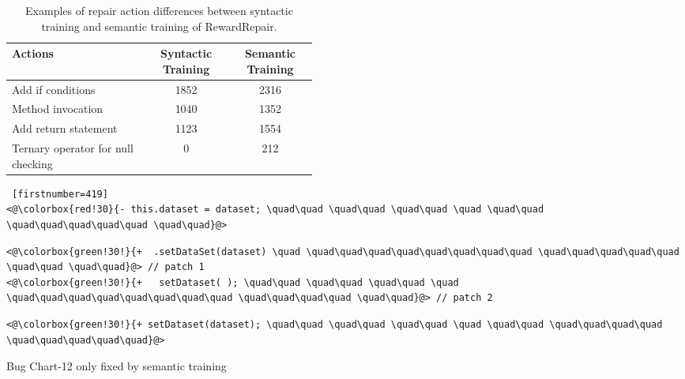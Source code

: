 \begin{table}[t]
\footnotesize
\renewcommand{\arraystretch}{1.1}
\begin{tabular}{p{0.45\linewidth}cc}
\hline
 Actions & Syntactic Training & Semantic Training  \\
 \hline
 
\multirow{1}{*}{Add if conditions} &\multirow{1}{*}{1852} &\multirow{1}{*}{2316} \\ 

Method invocation & 1040 & 1352  \\

Add return statement & 1123 & 1554  \\

Ternary operator for null checking & 0&212\\
\hline
\end{tabular}
\caption{Examples of repair action differences between syntactic training and semantic training of RewardRepair.}
\label{tab:ablation-cases}
\end{table}
\begin{listing}[t!]
\noindent\begin{minipage}[b]{0.5\textwidth}
    \begin{lstlisting} [firstnumber=419] 
<@\colorbox{red!30}{- this.dataset = dataset; \quad\quad \quad\quad \quad\quad \quad \quad\quad \quad\quad\quad\quad\quad \quad\quad}@>           
    \end{lstlisting}
 
   \label{motivate-human-patch}  
    \end{minipage}%
    \hfill
    \begin{minipage}[b]{0.49\textwidth}
    \begin{lstlisting}[firstnumber=419] 
<@\colorbox{green!30!}{+  .setDataSet(dataset) \quad \quad\quad\quad\quad\quad\quad\quad\quad \quad\quad\quad\quad\quad \quad\quad \quad\quad}@> // patch 1
<@\colorbox{green!30!}{+   setDataset( ); \quad\quad \quad\quad \quad\quad \quad \quad\quad\quad\quad\quad\quad\quad\quad \quad\quad\quad\quad \quad\quad}@> // patch 2
    \end{lstlisting}
 
 \label{motivate-noncompile-patch}   
\end{minipage}%
\hfill
    \begin{minipage}[b]{0.49\textwidth}
    \begin{lstlisting}[firstnumber=419] 
<@\colorbox{green!30!}{+ setDataset(dataset); \quad\quad \quad\quad \quad\quad \quad \quad\quad \quad\quad\quad\quad \quad\quad\quad\quad\quad}@>
    \end{lstlisting} 
    \label{motivate-correct-patch} 
\end{minipage}%

\caption{Bug Chart-12 only fixed by semantic training}
\label{lst:chart-12-rq3}
\end{listing}

